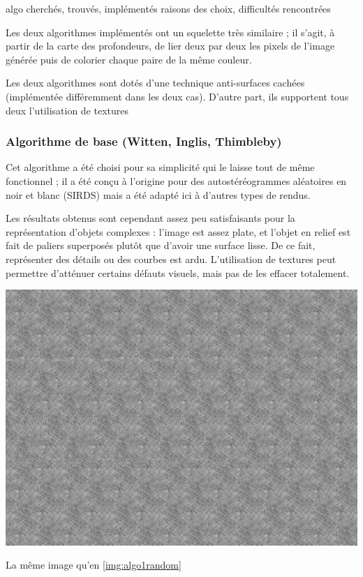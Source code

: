algo cherchés, trouvés, implémentés
  raisons des choix, difficultés rencontrées

  Les deux algorithmes implémentés ont un squelette très similaire ; il s'agit, à partir de la carte des profondeurs, de lier deux par deux les pixels de l'image générée puis de colorier chaque paire de la même couleur.

  Les deux algorithmes sont dotés d'une technique anti-surfaces cachées (implémentée différemment dans les deux cas). D'autre part, ils supportent tous deux l'utilisation de textures 
  
  \subsubsection{Algorithme de base (Witten, Inglis, Thimbleby)}

  Cet algorithme a été choisi pour sa simplicité qui le laisse tout de même fonctionnel ; il a été conçu à l'origine pour des autostéréogrammes aléatoires en noir et blanc (SIRDS) mais a été adapté ici à d'autres types de rendus.

  Les résultats obtenus sont cependant assez peu satisfaisants pour la représentation d'objets complexes : l'image est assez plate, et l'objet en relief est fait de paliers superposés plutôt que d'avoir une surface lisse. De ce fait, représenter des détails ou des courbes est ardu. L'utilisation de textures peut permettre d'atténuer certains défauts visuels, mais pas de les effacer totalement.

  \begin{center}
    \includegraphics{autostereogramme1texture.png}
    \label{img:algo1texture}
    \caption{La même image qu'en \ref{img:algo1random}}
  \end{center}
  
